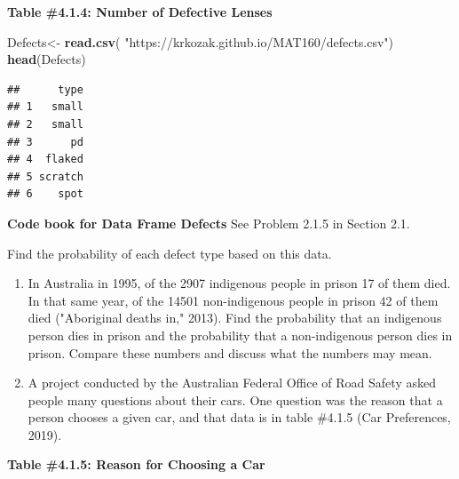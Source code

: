 \documentclass[
]{book}
\newenvironment{Shaded}{\begin{snugshade}}{\end{snugshade}}
\newcommand{\KeywordTok}[1]{\textcolor[rgb]{0.13,0.29,0.53}{\textbf{#1}}}
\newcommand{\NormalTok}[1]{#1}
\newcommand{\StringTok}[1]{\textcolor[rgb]{0.31,0.60,0.02}{#1}}
\begin{document}
\textbf{Table \#4.1.4: Number of Defective Lenses}

\begin{Shaded}
\begin{Highlighting}[]
\NormalTok{Defects<-}\StringTok{ }\KeywordTok{read.csv}\NormalTok{(}
  \StringTok{"https://krkozak.github.io/MAT160/defects.csv"}\NormalTok{) }
\KeywordTok{head}\NormalTok{(Defects)}
\end{Highlighting}
\end{Shaded}

\begin{verbatim}
##      type
## 1   small
## 2   small
## 3      pd
## 4  flaked
## 5 scratch
## 6    spot
\end{verbatim}

\textbf{Code book for Data Frame Defects} See Problem 2.1.5 in Section 2.1.

Find the probability of each defect type based on this data.

\begin{enumerate}
\def\labelenumi{\arabic{enumi}.}
\setcounter{enumi}{2}
\item
  In Australia in 1995, of the 2907 indigenous people in prison 17 of them died. In that same year, of the 14501 non-indigenous people in prison 42 of them died ("Aboriginal deaths in," 2013). Find the
  probability that an indigenous person dies in prison and the probability that a non-indigenous person dies in prison. Compare these numbers and discuss what the numbers may mean.
\item
  A project conducted by the Australian Federal Office of Road Safety asked people many questions about their cars. One question was the reason that a person chooses a given car, and that data is in table
  \#4.1.5 (Car Preferences, 2019).
\end{enumerate}

\textbf{Table \#4.1.5: Reason for Choosing a Car}
\end{document}
